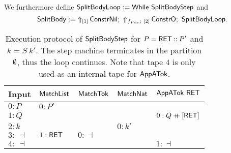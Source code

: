 \begin{definition}[$\MS{SplitBody}$]
  We furthermore define $\MS{SplitBodyLoop} := \While~\MS{SplitBodyStep}$ and
  \[
    \MS{SplitBody} := \LiftTapes{\MS{ConstrNil}}{\Vector{1}} \Seq \LiftBoth{\MS{ConstrO}}{f_{Var}}{\Vector{2}} \Seq \MS{SplitBodyLoop}.
  \]
\end{definition}

\begin{table}[t]
  \centering
  \begin{tabular}{l||l|l|l|l}
    Input       & $\MS{MatchList}$ & $\MS{MatchTok}$ & $\MS{MatchNat}$ & $\MS{AppATok}~\MS{RET}$ \\ \hline
    $0:P$       & $0:P'$           &                 &                 &                         \\
    $1:Q$       &                  &                 &                 & $0: Q \app [\MS{RET}]$  \\
    $2:k$       &                  &                 & $0: k'$         &                         \\
    $3:~\dashv$ & $1: \MS{RET}$    & $0: \dashv$     &                 &                         \\
    $4:~\dashv$ &                  &                 &                 & $1: \dashv$             \\
  \end{tabular}
  \caption{Execution protocol of $\MS{SplitBodyStep}$ for $P=\MS{RET} \cons P'$ and $k=S~k'$.  The step machine terminates in the partition $\None$,
    thus the loop continues.  Note that tape $4$ is only used as an internal tape for $\MS{AppATok}$.}
  \label{tab:exec-JumpTarget-RET}
\end{table}

